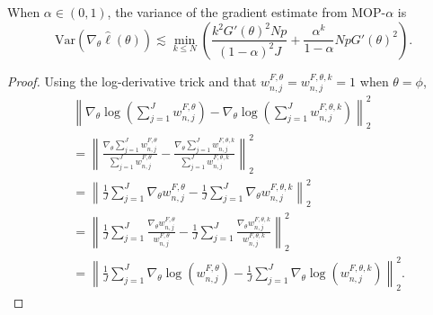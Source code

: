 \begin{thm}
    When $\alpha \in (0,1)$, the variance of the gradient estimate from MOP-$\alpha$ is
    $$\text{Var}(\nabla_\theta \hat\ell(\theta)) \lesssim \min_{k\leq N} \left(\frac{k^2G'(\theta)^2Np}{(1-\alpha)^2J} + \frac{\alpha^{k}}{1-\alpha}NpG'(\theta)^2 \right).$$
\end{thm}
\begin{proof}
    
Using the log-derivative trick and that $w_{n,j}^{F,\theta} = w_{n,j}^{F,\theta,k} = 1$ when $\theta=\phi$,
\begin{align}
    &\left\lVert\nabla_\theta\log\left(\sum_{j=1}^J w_{n,j}^{F,\theta}\right)-\nabla_\theta\log\left(\sum_{j=1}^J w_{n,j}^{F,\theta,k}\right)\right\rVert_2^2\\
    &= \left\lVert\frac{\nabla_\theta\sum_{j=1}^J w_{n,j}^{F,\theta}}{{\sum_{j=1}^J w_{n,j}^{F,\theta}}}-\frac{\nabla_\theta\sum_{j=1}^J w_{n,j}^{F,\theta,k}}{{\sum_{j=1}^J w_{n,j}^{F,\theta,k}}}\right\rVert_2^2 \\
    &= \left\lVert\frac{1}{J}\sum_{j=1}^J \nabla_\theta w_{n,j}^{F,\theta}-\frac{1}{J}\sum_{j=1}^J \nabla_\theta w_{n,j}^{F,\theta,k}\right\rVert_2^2 \\
    &= \left\lVert\frac{1}{J}\sum_{j=1}^J \frac{\nabla_\theta w_{n,j}^{F,\theta}}{w_{n,j}^{F,\theta}}-\frac{1}{J}\sum_{j=1}^J \frac{\nabla_\theta w_{n,j}^{F,\theta,k}}{w_{n,j}^{F,\theta,k}}\right\rVert_2^2\\
    &= \left\lVert\frac{1}{J}\sum_{j=1}^J \nabla_\theta \log\left(w_{n,j}^{F,\theta}\right)-\frac{1}{J}\sum_{j=1}^J \nabla_\theta \log\left(w_{n,j}^{F,\theta,k}\right)\right\rVert_2^2.
\end{align}


\end{proof}
